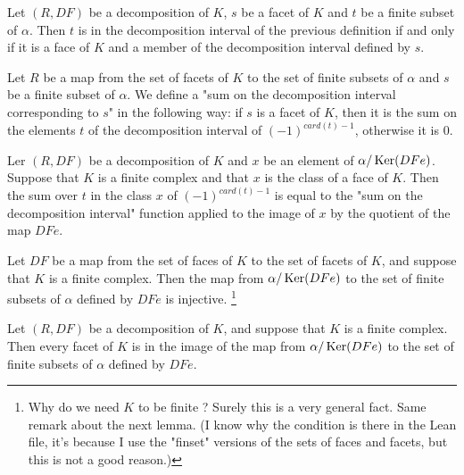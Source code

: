\begin{sublemma}[ComparisonIntervals]
Let $(R,DF)$ be a decomposition of $K$, $s$ be a facet of $K$ and $t$ be a finite subset of $\alpha$.
Then $t$ is in the decomposition interval of the previous definition if and only if it is a face of $K$ and a member of the 
decomposition interval defined by $s$.

\end{sublemma}

\begin{subdefi}
Let $R$ be a map from the set of facets of $K$ to the set of finite subsets of $\alpha$ and $s$ be a finite subset of $\alpha$.
We define a "sum on the decomposition interval corresponding to $s$" in the following way: if $s$ is a facet of $K$, then it is the
sum on the elements $t$ of the decomposition interval of $(-1)^{card(t)-1}$, otherwise it is $0$.

\end{subdefi}

\begin{sublemma}[ComparisonFunctionsonQuotient]
Ler $(R,DF)$ be a decomposition of $K$ and $x$ be an element of $\alpha/\operatorname{Ker}(DFe)$. Suppose that $K$ is a finite complex and
that $x$ is the class of a face of $K$. Then the sum over $t$ in the class $x$ of $(-1)^{card(t)-1}$ is equal to the
"sum on the decomposition interval" function applied to the image of $x$ by the quotient of the map $DFe$.

\end{sublemma}

\begin{sublemma}
Let $DF$ be a map from the set of faces of $K$ to the set of facets of $K$, and suppose that $K$ is a finite complex.
Then the map from $\alpha/\operatorname{Ker}(DFe)$ to the set of finite subsets of $\alpha$ defined by $DFe$ is injective.
\footnote{Why do we need $K$ to be finite ? Surely this is a very general fact. Same remark about the next lemma.
(I know why the condition is there in the Lean file, it's because I use the "finset" versions of the sets of faces and facets, but this
is not a good reason.)}
\end{sublemma}

\begin{sublemma}
Let $(R,DF)$ be a decomposition of $K$, and suppose that $K$ is a finite complex.
Then every facet of $K$ is in the image of the map from $\alpha/\operatorname{Ker}(DFe)$ to the set of finite subsets of $\alpha$ defined by $DFe$.
\end{sublemma}

